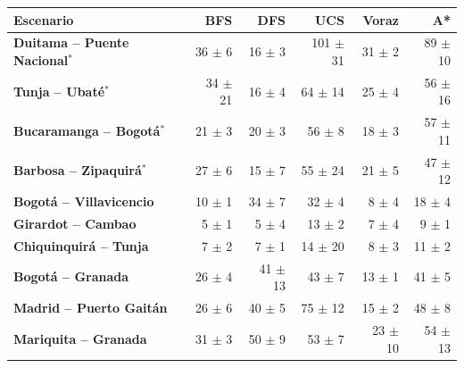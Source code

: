 \renewcommand{\arraystretch}{1.2}
\begin{tabular}{|l|r|r|r|r|r|}
\hline
\rowcolor{gray!20} \textbf{Escenario} & \textbf{BFS} & \textbf{DFS} & \textbf{UCS} & \textbf{Voraz} & \textbf{A*} \\
\hline
\textbf{Duitama -- Puente Nacional$^{*}$} & 36 $\pm$ 6 & 16 $\pm$ 3 & 101 $\pm$ 31 & 31 $\pm$ 2 & 89 $\pm$ 10 \\
\hline
\textbf{Tunja -- Ubaté$^{*}$} & 34 $\pm$ 21 & 16 $\pm$ 4 & 64 $\pm$ 14 & 25 $\pm$ 4 & 56 $\pm$ 16 \\
\hline
\textbf{Bucaramanga -- Bogotá$^{*}$} & 21 $\pm$ 3 & 20 $\pm$ 3 & 56 $\pm$ 8 & 18 $\pm$ 3 & 57 $\pm$ 11 \\
\hline
\textbf{Barbosa -- Zipaquirá$^{*}$} & 27 $\pm$ 6 & 15 $\pm$ 7 & 55 $\pm$ 24 & 21 $\pm$ 5 & 47 $\pm$ 12 \\
\hline
\textbf{Bogotá -- Villavicencio} & 10 $\pm$ 1 & 34 $\pm$ 7 & 32 $\pm$ 4 & 8 $\pm$ 4 & 18 $\pm$ 4 \\
\hline
\textbf{Girardot -- Cambao} & 5 $\pm$ 1 & 5 $\pm$ 4 & 13 $\pm$ 2 & 7 $\pm$ 4 & 9 $\pm$ 1 \\
\hline
\textbf{Chiquinquirá -- Tunja} & 7 $\pm$ 2 & 7 $\pm$ 1 & 14 $\pm$ 20 & 8 $\pm$ 3 & 11 $\pm$ 2 \\
\hline
\textbf{Bogotá -- Granada} & 26 $\pm$ 4 & 41 $\pm$ 13 & 43 $\pm$ 7 & 13 $\pm$ 1 & 41 $\pm$ 5 \\
\hline
\textbf{Madrid -- Puerto Gaitán} & 26 $\pm$ 6 & 40 $\pm$ 5 & 75 $\pm$ 12 & 15 $\pm$ 2 & 48 $\pm$ 8 \\
\hline
\textbf{Mariquita -- Granada} & 31 $\pm$ 3 & 50 $\pm$ 9 & 53 $\pm$ 7 & 23 $\pm$ 10 & 54 $\pm$ 13 \\
\hline
\end{tabular}
